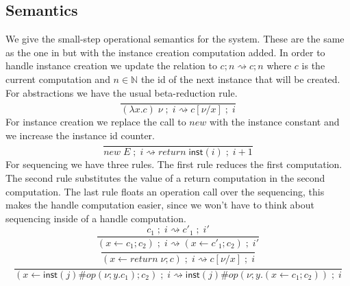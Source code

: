 \documentclass[12pt]{article}
\newcommand\op[0]{op}
\newcommand\val[0]{\nu}
\newcommand\vinst[1]{\mathsf{inst}(#1)}
\newcommand\vabs[2]{\lambda #1 . #2}
\newcommand\comp[0]{c}
\newcommand\creturn[1]{\textit{return} \; #1}
\newcommand\capp[2]{#1 \; #2}
\newcommand\cdo[3]{#1 \leftarrow #2 ; #3}
\newcommand\copi[5]{#1 \# #2(#3 ; #4 . #5)}
\newcommand\cnew[1]{\textit{new} \; #1}
\newcommand\sep[0]{\;;\;}
\begin{document}
\subsection{Semantics}
We give the small-step operational semantics for the system. These are the same as the one in \cite{effectsystem} but with the instance creation computation added. In order to handle instance creation we update the relation to $\comp; n \rightsquigarrow \comp;n$ where $\comp$ is the current computation and $n \in \mathbb{N}$ the id of the next instance that will be created. \\
For abstractions we have the usual beta-reduction rule.\\
\[\frac{
}{
	\capp{(\vabs{x}{\comp})}{\val}\sep i \rightsquigarrow \comp[\val/x]\sep i
}\]
For instance creation we replace the call to $new$ with the instance constant and we increase the instance id counter.\\
\[\frac{
}{
	\cnew{E}\sep i \rightsquigarrow \creturn{\vinst{i}}\sep i + 1
}\]
For sequencing we have three rules. The first rule reduces the first computation.
The second rule substitutes the value of a return computation in the second computation.
The last rule floats an operation call over the sequencing, this makes the handle computation easier, since we won't have to think about sequencing inside of a handle computation.\\
\[\frac{
	\comp_1\sep i \rightsquigarrow \comp'_1\sep i'
}{
	(\cdo{x}{\comp_1}{\comp_2})\sep i \rightsquigarrow (\cdo{x}{\comp'_1}{\comp_2})\sep i'
}\]
\[\frac{
}{
	(\cdo{x}{\creturn{\val}}{\comp})\sep i \rightsquigarrow \comp[\val/x]\sep i
}\]
\[\frac{
}{
	(\cdo{x}{\copi{\vinst{j}}{\op}{\val}{y}{\comp_1}}{\comp_2})\sep i \rightsquigarrow \copi{\vinst{j}}{\op}{\val}{y}{(\cdo{x}{\comp_1}{\comp_2})}\sep i
}\]
\end{document}
